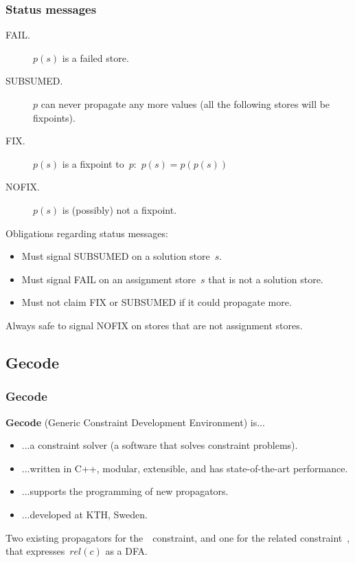 \documentclass{beamer}
\newcommand{\Table}{\Constraint{Table}}
\begin{document}
\begin{frame}
  \frametitle{Status messages}
  \begin{description}
    \item[FAIL.] $p(s)$ is a failed store.
    \item[SUBSUMED.] $p$ can never propagate any more values
      (all the following stores will be fixpoints).
    \item[FIX.] $p(s)$ is a fixpoint to~$p$:~$p(s) = p(p(s))$
    \item[NOFIX.] $p(s)$ is (possibly) not a fixpoint.
  \end{description}

  Obligations regarding status messages:
  \begin{itemize}
    \item Must signal SUBSUMED on a solution store~$s$.
    \item Must signal FAIL on an assignment store~$s$ that is not a solution store.
    \item Must not claim FIX or SUBSUMED if it could propagate more.
  \end{itemize}

  Always safe to signal NOFIX on stores that are not assignment stores.
  
\end{frame}

\subsection{Gecode}

\begin{frame}
  \frametitle{Gecode}
  \textbf{Gecode} (Generic Constraint Development Environment)
  is...

  \begin{itemize}
    \item ...a constraint solver (a software that solves constraint problems).
    \item ...written in C++, modular, extensible, and has state-of-the-art performance.
    \item ...supports the programming of new propagators.
    \item ...developed at KTH, Sweden.
  \end{itemize}

  Two existing propagators for the~\Table~constraint, and one for the 
  related constraint~, that expresses~$rel(c)$ as a DFA.

\end{frame}
\end{document}
